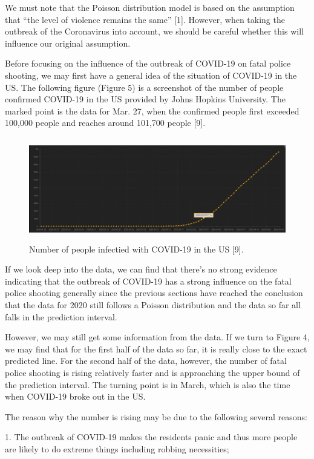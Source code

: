 \documentclass[a4paper]{article}
\begin{document}
	We must note that the Poisson distribution model is based on the assumption that “the level of violence remains the same” [1]. However, when taking the outbreak of the Coronavirus into account, we should be careful whether this will influence our original assumption.
	
	Before focusing on the influence of the outbreak of COVID-19 on fatal police shooting, we may first have a general idea of the situation of COVID-19 in the US. The following figure (Figure 5) is a screenshot of the number of people confirmed COVID-19 in the US provided by Johns Hopkins University. The marked point is the data for Mar. 27, when the confirmed people first exceeded 100,000 people and reaches around 101,700 people [9].
	
	\begin{figure}[H]
	\centering
	\includegraphics[width=122.2mm,height=45mm]{covid19.jpg}
	\caption{Number of people infectied with COVID-19 in the US [9].}
	\end{figure}
	
	If we look deep into the data, we can find that there's no strong evidence indicating that the outbreak of COVID-19 has a strong influence on the fatal police shooting generally since the previous sections have reached the conclusion that the data for 2020 still follows a Poisson distribution and the data so far all falls in the prediction interval.
	
	However, we may still get some information from the data. If we turn to Figure 4, we may find that for the first half of the data so far, it is really close to the exact predicted line. For the second half of the data, however, the number of fatal police shooting is rising relatively faster and is approaching the upper bound of the prediction interval. The turning point is in March, which is also the time when COVID-19 broke out in the US.
	
	The reason why the number is rising may be due to the following several reasons:
	
	1. The outbreak of COVID-19 makes the residents panic and thus more people are likely to do extreme things including robbing necessities;
	
\end{document}

